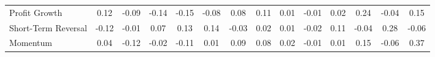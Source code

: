 \begin{tabular}{lccccccccccccc}
Profit Growth       &          0.12 & -0.09 &       -0.14 &  -0.15 &     -0.08 &           0.08 &     0.11 &         0.01 &     -0.01 &           0.02 &           0.24 &                -0.04 &      0.15 \\
Short-Term Reversal &         -0.12 & -0.01 &        0.07 &   0.13 &      0.14 &          -0.03 &     0.02 &         0.01 &     -0.02 &           0.11 &          -0.04 &                 0.28 &     -0.06 \\
Momentum            &          0.04 & -0.12 &       -0.02 &  -0.11 &      0.01 &           0.09 &     0.08 &         0.02 &     -0.01 &           0.01 &           0.15 &                -0.06 &      0.37 \\
\bottomrule
\end{tabular}
